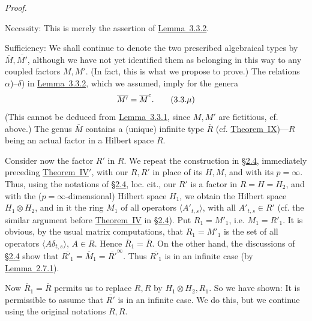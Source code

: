 \documentclass[b5paper,twoside]{article}
\newcommand{\secref}[2]{\hyperref[#1]{\mbox{\S#2}}}
\newcommand{\thmref}[2]{\hyperref[#1]{\mbox{Theorem~#2}}}
\newcommand{\lemref}[2]{\hyperref[#1]{\mbox{Lemma~#2}}}
\theoremstyle{mvnplain}
\renewenvironment{proof}[1][Proof]{%
  \par\addvspace{0.35\baselineskip}%
  \noindent\textit{#1.}\ \normalfont\ignorespaces
}{%
  \par\addvspace{0.35\baselineskip}%
}
\newcommand{\M}{\mathbf M}
\newcommand{\R}{\mathbf R}
\newcommand{\Hilbert}{\mathfrak H}
\def\M{M}%
\def\R{R}%
\def\Hilbert{H}%
\def\widetilde#1{#1}%
\def\mathfrak#1{#1}%
\begin{document}
\begin{proof}
Necessity: This is merely the assertion of \lemref{lem:3.3.2}{3.3.2}.

Sufficiency: We shall continue to denote the two prescribed algebraical types
by \(\overline{\M},\overline{\M'}\), although we have not yet identified them
as belonging in this way to any coupled factors \(\M,\M'\). (In fact, this is
what we propose to prove.) The relations \(\alpha\))--\(\delta\)) in
\lemref{lem:3.3.2}{3.3.2}, which we assumed, imply for the genera
\begin{equation}
  \widetilde{\overline{\M'}}
 =\widetilde{\overline{\M}}^{c}.
  \tag{3.3.\ensuremath{\mu}}\label{eq:3.3.mu}
\end{equation}
(This cannot be deduced from \lemref{lem:3.3.1}{3.3.1}, since
\(\M,\M'\) are fictitious, cf. above.) The genus
\(\widetilde{\overline{\M}}\) contains a (unique) infinite type
\(\overline{\R}\) (cf. \thmref{thm:IX}{IX})---\(\R\) being an actual factor
in a Hilbert space \(\mathfrak R\).

Consider now the factor \(\R'\) in \(\mathfrak R\). We repeat the construction
in \secref{sec:2.4}{2.4}, immediately preceding
\thmref{thm:IV-prime}{IV$'$}, with our \(\mathfrak R,\R'\) in place of its
\(\Hilbert,\M\), and with its \(p=\infty\). Thus, using the notations of
\secref{sec:2.4}{2.4}, loc. cit., our \(\R'\) is a factor in
\(\mathfrak R=\Hilbert=\Hilbert_2\), and with the (\(p=\infty\)-dimensional)
Hilbert space \(\Hilbert_1\), we obtain the Hilbert space
\(\Hilbert_1\otimes\Hilbert_2\), and in it the ring \(\M_1\) of all
operators \(\langle A'_{t,s}\rangle\), with all \(A'_{t,s}\in\R'\) (cf. the
similar argument before \thmref{thm:IV}{IV} in \secref{sec:2.4}{2.4}). Put
\(\R_1=\M'_1\), i.e. \(\M_1=\R'_1\). It is obvious, by the usual matrix
computations, that \(\R_1=\M'_1\) is the set of all operators
\(\langle A\delta_{t,s}\rangle\), \(A\in\R\). Hence
\(\overline{\R}_1=\overline{\R}\). On the other hand, the discussions of
\secref{sec:2.4}{2.4} show that
\(\overline{\R'_1}=\overline{\M}_1=\overline{\R'}^{\infty}\). Thus
\(\overline{\R'_1}\) is in an infinite case (by
\lemref{lem:2.7.1}{2.7.1}).

Now \(\overline{\R}_1=\overline{\R}\) permits us to replace
\(\mathfrak R,\R\) by \(\Hilbert_1\otimes\Hilbert_2,\R_1\). So we have
shown: It is permissible to assume that \(\overline{\R'}\) is in an infinite
case. We do this, but we continue using the original notations
\(\mathfrak R,\R\).


\end{proof}
\end{document}
